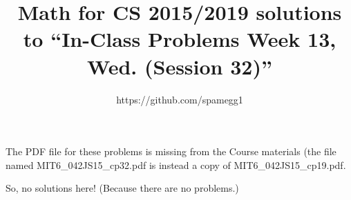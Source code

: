 \documentclass[14pt]{extarticle}
\title{Math for CS 2015/2019 solutions to ``In-Class Problems Week 13, Wed. (Session 32)''}
\author{https://github.com/spamegg1}
\begin{document}
\maketitle
\tableofcontents

The PDF file for these problems is missing from the Course materials (the file named MIT6\_042JS15\_cp32.pdf is instead a copy of MIT6\_042JS15\_cp19.pdf.

So, no solutions here! (Because there are no problems.)
\end{document}
